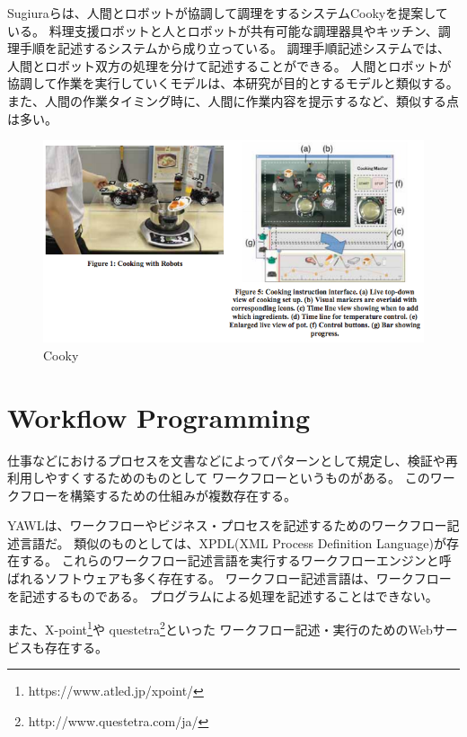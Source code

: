 \mbox{}

Sugiuraらは、人間とロボットが協調して調理をするシステムCooky\cite{cooky}を提案している。
料理支援ロボットと人とロボットが共有可能な調理器具やキッチン、調理手順を記述するシステムから成り立っている。
調理手順記述システムでは、人間とロボット双方の処理を分けて記述することができる。
人間とロボットが協調して作業を実行していくモデルは、本研究が目的とするモデルと類似する。
また、人間の作業タイミング時に、人間に作業内容を提示するなど、類似する点は多い。

\begin{figure}[htbp]
  \begin{center}
  \includegraphics[width=.6\linewidth,bb=0 0 633 336]{images/cooky.png}
  \end{center}
  \caption{Cooky}
  \label{fig:cooky}
\end{figure}

\section{Workflow Programming}\label{workflow-programming}

仕事などにおけるプロセスを文書などによってパターンとして規定し、検証や再利用しやすくするためのものとして
ワークフローというものがある。
このワークフローを構築するための仕組みが複数存在する。

YAWL\cite{yawl}は、ワークフローやビジネス・プロセスを記述するためのワークフロー記述言語だ。
類似のものとしては、XPDL(XML Process Definition
Language)\cite{xpdl}が存在する。
これらのワークフロー記述言語を実行するワークフローエンジンと呼ばれるソフトウェアも多く存在する。
ワークフロー記述言語は、ワークフローを記述するものである。
プログラムによる処理を記述することはできない。

また、X-point\footnote{https://www.atled.jp/xpoint/}や
questetra\footnote{http://www.questetra.com/ja/}といった
ワークフロー記述・実行のためのWebサービスも存在する。
